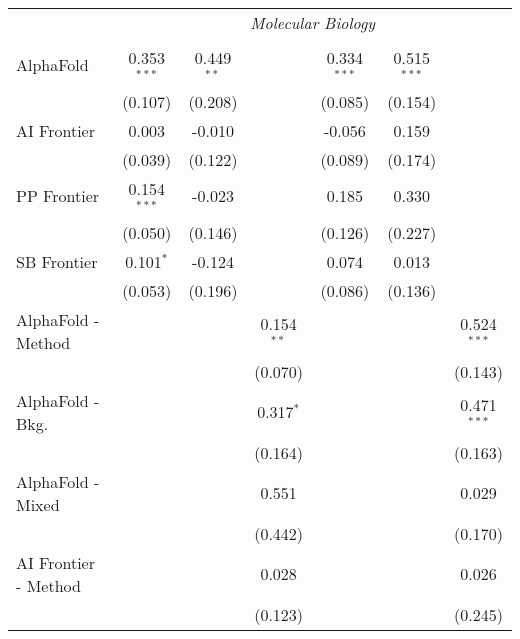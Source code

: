 \begin{tabular}{lcccccc}
 & \multicolumn{6}{c}{\textit{Molecular Biology}} \\ \\
   AlphaFold            & 0.353$^{***}$ & 0.449$^{**}$ &              & 0.334$^{***}$ & 0.515$^{***}$ &   \\   
                        & (0.107)       & (0.208)      &              & (0.085)       & (0.154)       &   \\   
   AI Frontier          & 0.003         & -0.010       &              & -0.056        & 0.159         &   \\   
                        & (0.039)       & (0.122)      &              & (0.089)       & (0.174)       &   \\   
   PP Frontier          & 0.154$^{***}$ & -0.023       &              & 0.185         & 0.330         &   \\   
                        & (0.050)       & (0.146)      &              & (0.126)       & (0.227)       &   \\   
   SB Frontier          & 0.101$^{*}$   & -0.124       &              & 0.074         & 0.013         &   \\   
                        & (0.053)       & (0.196)      &              & (0.086)       & (0.136)       &   \\   
   AlphaFold - Method   &               &              & 0.154$^{**}$ &               &               & 0.524$^{***}$\\   
                        &               &              & (0.070)      &               &               & (0.143)\\   
   AlphaFold - Bkg.     &               &              & 0.317$^{*}$  &               &               & 0.471$^{***}$\\   
                        &               &              & (0.164)      &               &               & (0.163)\\   
   AlphaFold - Mixed    &               &              & 0.551        &               &               & 0.029\\   
                        &               &              & (0.442)      &               &               & (0.170)\\   
   AI Frontier - Method &               &              & 0.028        &               &               & 0.026\\   
                        &               &              & (0.123)      &               &               & (0.245)\\   

\end{tabular}
